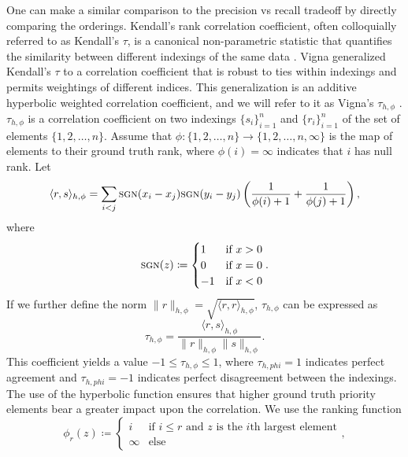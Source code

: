 \documentclass[10]{article}
\newcommand{\algoname}[1]{\textnormal{\textsc{#1}}}
\begin{document}
One can make a similar comparison to the precision vs recall tradeoff by directly comparing the orderings.
Kendall's rank correlation coefficient, often colloquially referred to as Kendall's $\tau$, is a canonical non-parametric statistic that quantifies the similarity between different indexings of the same data \cite{kendall1938new}.
Vigna generalized Kendall's $\tau$ to a correlation coefficient that is robust to ties within indexings and permits weightings of different indices.
This generalization is an additive hyperbolic weighted correlation coefficient, and we will refer to it as Vigna's $\tau_{h, \phi}$ \cite{vigna2015weighted}.
$\tau_{h, \phi}$ is a correlation coefficient on two indexings $\{s_i\}_{i=1}^n$ and $\{r_i\}_{i=1}^n$ of the set of elements $\{1, 2, \dots, n\}$.
Assume that $\phi : \{1, 2, \dots, n\} \rightarrow \{1, 2, \dots, n, \infty\}$ is the map of elements to their ground truth rank, where $\phi(i) = \infty$ indicates that $i$ has null rank. 
Let
%
\begin{equation} \label{eq:tau_inner}
\langle r, s \rangle_{h, \phi} = \sum_{i < j} \algoname{sgn}(x_i - x_j)\algoname{sgn}(y_i - y_j) \left ( \frac{1}{\phi(i)+ 1} + \frac{1}{\phi(j)+ 1} \right ),
\end{equation}
%
where 
%
\begin{equation} \label{eq:sgn}
\algoname{sgn}(z) \coloneqq 
\begin{cases}
	1 &\text{if $x > 0$}\\
	0 &\text{if $x = 0$}\\
	-1 &\text{if $x < 0$}
\end{cases}. 
\end{equation}
%
If we further define the norm $\| r \|_{h, \phi} = \sqrt{ \langle r, r \rangle_{h, \phi}}$, $\tau_{h, \phi}$ can be expressed as 
%
\begin{equation} \label{eq:tau}
\tau_{h, \phi} = \frac{\langle r, s \rangle_{h, \phi}} {\| r \|_{h, \phi} \| s \|_{h, \phi}}.
\end{equation}
%
This coefficient yields a value $-1 \leq \tau_{h, \phi} \leq 1$, where $\tau_{h, phi} = 1$ indicates perfect agreement and $\tau_{h, phi} = -1$ indicates perfect disagreement between the indexings.
The use of the hyperbolic function ensures that higher ground truth priority elements bear a greater impact upon the correlation. 
We use the ranking function
%
\begin{equation} \label{eq:phi}
\phi_r(z) \coloneqq 
\begin{cases}
	i &\text{if $i \leq r$ and $z$ is the $i$th largest element}\\
	\infty &\text{else}
\end{cases},
\end{equation}
\end{document}
